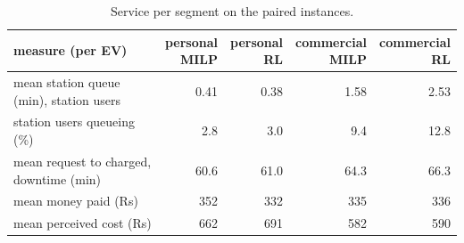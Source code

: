 \begin{table}[H]\centering
\small
\caption{Service per segment on the paired instances.}\label{tab:segm}
\begin{adjustbox}{max width=\textwidth}\begin{tabular}{lrrrr}\toprule
measure (per EV) & \shortstack{personal\\MILP} & \shortstack{personal\\RL} & \shortstack{commercial\\MILP} & \shortstack{commercial\\RL} \\ \midrule
mean station queue (min), station users & 0.41 & 0.38 & 1.58 & 2.53 \\
station users queueing (\%) & 2.8 & 3.0 & 9.4 & 12.8 \\
mean request to charged, downtime (min) & 60.6 & 61.0 & 64.3 & 66.3 \\
mean money paid (Rs) & 352 & 332 & 335 & 336 \\
mean perceived cost (Rs) & 662 & 691 & 582 & 590 \\
\bottomrule\end{tabular}\end{adjustbox}\end{table}
